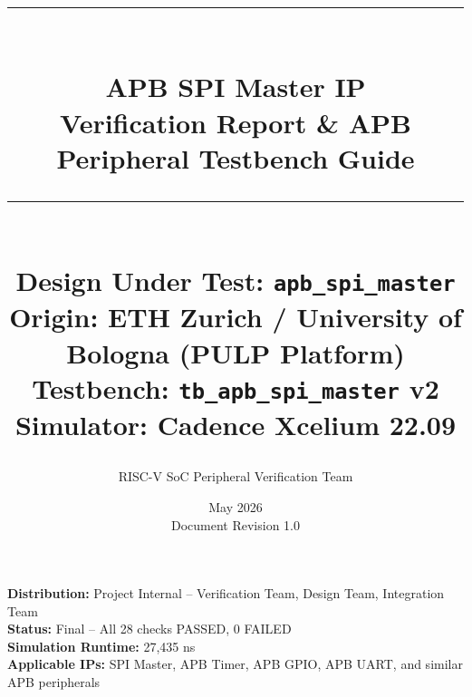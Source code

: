 \documentclass[10pt,a4paper]{report}
\title{
  \vspace{-1cm}
  \rule{\textwidth}{1.5pt}\\[0.4cm]
  {\Huge\bfseries APB SPI Master IP}\\[0.3cm]
  {\LARGE Verification Report \& APB Peripheral Testbench Guide}\\[0.3cm]
  \rule{\textwidth}{1.5pt}\\[1cm]
  {\large Design Under Test: \texttt{apb\_spi\_master}}\\
  {\large Origin: ETH Zurich / University of Bologna (PULP Platform)}\\
  {\large Testbench: \texttt{tb\_apb\_spi\_master} v2}\\
  {\large Simulator: Cadence Xcelium 22.09}\\[1cm]
}
\author{RISC-V SoC Peripheral Verification Team}
\date{May 2026 \\ Document Revision 1.0}
\begin{document}
\maketitle
\thispagestyle{empty}

\vfill
\noindent\textbf{Distribution:} Project Internal -- Verification Team, Design Team, Integration Team\\
\textbf{Status:} Final -- All 28 checks PASSED, 0 FAILED\\
\textbf{Simulation Runtime:} 27,435 ns\\
\textbf{Applicable IPs:} SPI Master, APB Timer, APB GPIO, APB UART, and similar APB peripherals

\clearpage
\tableofcontents
\clearpage
\listoftables
\listoffigures
\clearpage












\end{document}
